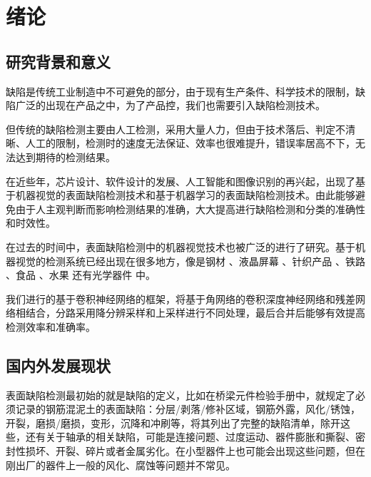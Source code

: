 \chapter{绪论}
\section{研究背景和意义}

缺陷是传统工业制造中不可避免的部分，由于现有生产条件、科学技术的限制，缺陷广泛的出现在产品之中，为了产品控，我们也需要引入缺陷检测技术。

但传统的缺陷检测主要由人工检测，采用大量人力，但由于技术落后、判定不清晰、人工的限制，检测时的速度无法保证、效率也很难提升，错误率居高不下，无法达到期待的检测结果。

在近些年，芯片设计、软件设计的发展、人工智能和图像识别的再兴起，出现了基于机器视觉的表面缺陷检测技术和基于机器学习的表面缺陷检测技术。由此能够避免由于人主观判断而影响检测结果的准确，大大提高进行缺陷检测和分类的准确性和时效性。

在过去的时间中，表面缺陷检测中的机器视觉技术也被广泛的进行了研究。基于机器视觉的检测系统已经出现在很多地方，像是钢材%
、液晶屏幕%
、针织产品%
、铁路%
、食品%
、水果%
还有光学器件%
中。

我们进行的基于卷积神经网络的框架，将基于角网络的卷积深度神经网络和残差网络相结合，分路采用降分辨采样和上采样进行不同处理，最后合并后能够有效提高检测效率和准确率。

\section{国内外发展现状}






表面缺陷检测最初始的就是缺陷的定义，比如在桥梁元件检验手册中，就规定了必须记录的钢筋混泥土的表面缺陷：分层/剥落/修补区域，钢筋外露，风化/锈蚀，开裂，磨损/磨损，变形，沉降和冲刷等，将其列出了完整的缺陷清单，除开这些，还有关于轴承的相关缺陷，可能是连接问题、过度运动、器件膨胀和撕裂、密封性损坏、开裂、碎片或者金属劣化。在小型器件上也可能会出现这些问题，但在刚出厂的器件上一般的风化、腐蚀等问题并不常见。

